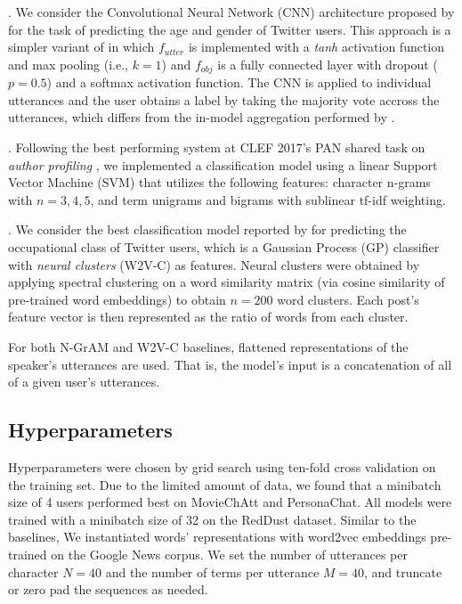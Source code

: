  \cite{bayot:MOD17}. We consider the Convolutional Neural Network (CNN) architecture proposed by \citeauthor{bayot:MOD17} for the task of predicting the age and gender of Twitter users. This approach is a simpler variant of  in which $f_{utter}$ is implemented with a \emph{tanh} activation function and max pooling (i.e., $k=1$) and $f_{obj}$ is a fully connected layer with dropout ($p=0.5$) and a softmax activation function.
The CNN is applied to individual utterances and the user obtains a label by taking the majority vote accross the utterances, which differs from the in-model aggregation performed by .

 \cite{basile:2017}. Following the best performing system at CLEF 2017's PAN shared task on \textit{author profiling} \cite{stein:2017o}, we implemented a classification model using a linear Support Vector Machine (SVM) \cite{cortes1995support} that utilizes the following features: character n-grams with $n=3,4,5$, and term unigrams and bigrams with sublinear tf-idf weighting.

 \cite{pietro:ACL15}. We consider the best classification model reported by \citeauthor{pietro:ACL15} for predicting the occupational class of Twitter users, which is a Gaussian Process (GP) classifier \cite{chu2005gaussian} with \textit{neural clusters} (W2V-C) as features. Neural clusters were obtained by applying spectral clustering on a word similarity matrix (via cosine similarity of pre-trained word embeddings) to obtain $n=200$ word clusters. Each post's feature vector is then represented as the ratio of words from each cluster.

\vspace{5pt}For both N-GrAM and W2V-C baselines, flattened representations of the speaker's utterances are used. That is, the model's input is a concatenation of all of a given user's utterances.

\subsection{Hyperparameters}
Hyperparameters were chosen by grid search using ten-fold cross validation on the training set.
Due to the limited amount of data, we found that a minibatch size of 4 users performed best on MovieChAtt and PersonaChat.
All models were trained with a minibatch size of 32 on the RedDust dataset.
Similar to the baselines, We instantiated words' representations with word2vec embeddings pre-trained on the Google News corpus.
We set the number of utterances per character $N=40$ and the number of terms per utterance $M=40$, and truncate or zero pad the sequences as needed.

